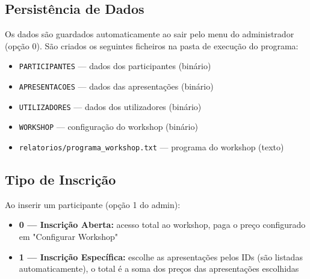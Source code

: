 \documentclass[12pt,a4paper]{article}
\begin{document}
\subsection{Persistência de Dados}

Os dados são guardados automaticamente ao sair pelo menu do administrador (opção 0). São criados os seguintes ficheiros na pasta de execução do programa:

\begin{itemize}
  \item \texttt{PARTICIPANTES} — dados dos participantes (binário)
  \item \texttt{APRESENTACOES} — dados das apresentações (binário)
  \item \texttt{UTILIZADORES} — dados dos utilizadores (binário)
  \item \texttt{WORKSHOP} — configuração do workshop (binário)
  \item \texttt{relatorios/programa\_workshop.txt} — programa do workshop (texto)
\end{itemize}

\subsection{Tipo de Inscrição}

Ao inserir um participante (opção 1 do admin):
\begin{itemize}
  \item \textbf{0 — Inscrição Aberta:} acesso total ao workshop, paga o preço configurado em "Configurar Workshop"
  \item \textbf{1 — Inscrição Específica:} escolhe as apresentações pelos IDs (são listadas automaticamente), o total é a soma dos preços das apresentações escolhidas
\end{itemize}
\end{document}
